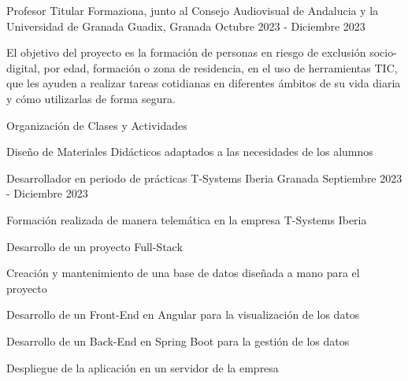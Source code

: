 

\begin{cventries}

  \cventry
    {Profesor Titular} %
    {Formaziona, junto al Consejo Audiovisual de Andalucia y la Universidad de Granada} %
    {Guadix, Granada} %
    {Octubre 2023 - Diciembre 2023} %
    {
      \begin{cvitems} %
        \item {El objetivo del proyecto es la formación de personas en riesgo de exclusión socio-digital, por edad, formación o zona de residencia, en el uso de herramientas TIC, que les ayuden a realizar tareas cotidianas en diferentes ámbitos de su vida diaria y cómo utilizarlas de forma segura.}
        \item {Organización de Clases y Actividades}
        \item {Diseño de Materiales Didácticos adaptados a las necesidades de los alumnos}
      \end{cvitems}
    }
    \vspace{2em} %
  \cventry
    {Desarrollador en periodo de prácticas} %
    {T-Systems Iberia} %
    {Granada} %
    {Septiembre 2023 - Diciembre 2023} %
    {
      \begin{cvitems} %
        \item {Formación realizada de manera telemática en la empresa T-Systems Iberia}
        \item {Desarrollo de un proyecto Full-Stack}
        \item {Creación y mantenimiento de una base de datos diseñada a mano para el proyecto}
        \item {Desarrollo de un Front-End en Angular para la visualización de los datos}
        \item {Desarrollo de un Back-End en Spring Boot para la gestión de los datos}
        \item {Despliegue de la aplicación en un servidor de la empresa}
      \end{cvitems}
    }
\end{cventries}
